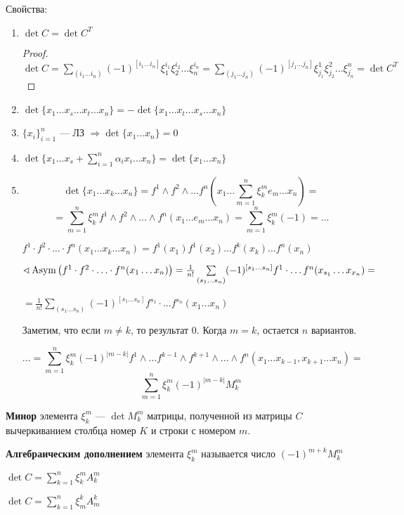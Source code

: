 Свойства:
\begin{enumerate}
    \item \(\det C=\det C^T\)
    \begin{proof}
        \(\det C = \sum\limits_{(i_1\ldots i_n)}(-1)^{[i_1\ldots i_n]}\xi_1^{i_1}\xi_2^{i_2}\ldots \xi_n^{i_n} = \sum\limits_{(j_1\ldots j_n)}(-1)^{[j_1\ldots j_n]} \xi^1_{j_1}\xi^2_{j_2}\ldots \xi^n_{j_n}=\det C^T\)
    \end{proof}
    \item \(\det \{x_1\ldots x_s\ldots x_t\ldots x_n\}=-\det \{x_1\ldots x_t\ldots x_s\ldots x_n\}\)
    \item \(\{x_i\}_{i=1}^n\) --- ЛЗ \(\Rightarrow \det \{x_1\ldots x_n\}=0\)
    \item \(\det\{x_1\ldots x_s+\sum\limits_{i=1}^n\alpha_i x_i\ldots x_n\}=\det\{x_1\ldots x_n\}\)
    \item \[\det\{x_1\ldots x_k\ldots x_n\}=f^1\wedge f^2\wedge \ldots f^n(x_1\ldots \sum\limits_{m=1}^{n}\xi_k^me_m\ldots x_n)=\]\[=\sum\limits_{m=1}^{n}\xi^m_k f^1\wedge f^2\wedge\ldots\wedge f^n(x_1\ldots e_m\ldots x_n)=\sum\limits_{m=1}^{n}\xi_k^m(-1)=\ldots\]
    \begin{remark}
        \(f^1\cdot f^2\cdot \ldots \cdot f^n(x_1\ldots x_k\ldots x_n)=f^1(x_1)f^1(x_2)\ldots f^k(x_k)\ldots f^n(x_n)\)
        
        \(\sphericalangle \operatorname{\text{Asym}}\left(f^1\cdot f^2\cdot \ldots \cdot f^n(x_1\ldots x_n) \right)=\frac{1}{n!}\sum\limits_{(s_1\ldots s_n)}(-1)^{[s_1\ldots s_n]} f^1\cdot \ldots f^n(x_{s_1}\ldots x_{x_n})=\)

        \(=\frac{1}{n!}\sum\limits_{(s_1\ldots s_n)}(-1)^{[s_1\ldots s_n]} f^{s_1}\cdot \ldots f^{s_n}(x_1\ldots x_n)\)

        Заметим, что если \(m\not=k\), то результат \(0\). Когда \(m=k\), остается \(n\) вариантов.
    \end{remark}

    \[\ldots =\sum\limits_{m=1}^n \xi_k^m (-1)^{|m-k|} f^1\wedge \ldots f^{k-1}\wedge f^{k+1}\wedge\ldots\wedge f^n(x_1\ldots x_{k-1},x_{k+1}\ldots x_n)=\]
    \[\sum\limits_{m=1}^n \xi_k^m(-1)^{|m-k|}M_k^m\]
\end{enumerate}
\begin{definition}
    \textbf{Минор} элемента \(\xi_k^m\) --- \(\det M_k^m\) матрицы, полученной из матрицы \(C\) вычеркиванием столбца номер \(K\) и строки с номером \(m\).
\end{definition}

\begin{definition}
    \textbf{Алгебраическим дополнением} элемента \(\xi_k^m\) называется число \((-1)^{m+k} M_k^m\)

    \(\det C = \sum\limits_{k=1}^n \xi_k^m A_k^m\)

    \(\det C = \sum\limits_{k=1}^n \xi_m^k A_m^k\)
\end{definition}

